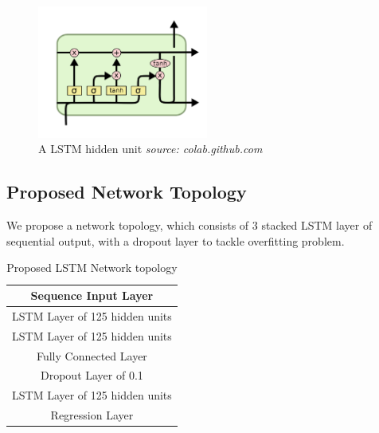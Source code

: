 \documentclass[11pt]{article}
\begin{document}
\begin{figure}[H]
  \centering
  \includegraphics[width=0.5\textwidth,keepaspectratio]{figs/lstm.png}
  \caption{A LSTM hidden unit \textit{source: colab.github.com}}
\end{figure}

\subsection{Proposed Network Topology}
We propose a network topology, which consists of 3 stacked LSTM layer of
sequential output, with a dropout layer to tackle overfitting problem.
\begin{table}[H]
  \centering
  \begin{tabular}{|c|}
    \hline
Sequence Input Layer           \\ \hline
LSTM Layer of 125 hidden units \\ \hline
LSTM Layer of 125 hidden units \\ \hline
Fully Connected Layer          \\ \hline
Dropout Layer of 0.1           \\ \hline
LSTM Layer of 125 hidden units \\ \hline
Regression Layer               \\ \hline
\end{tabular}
\caption{Proposed LSTM Network topology}
\end{table}
\end{document}
